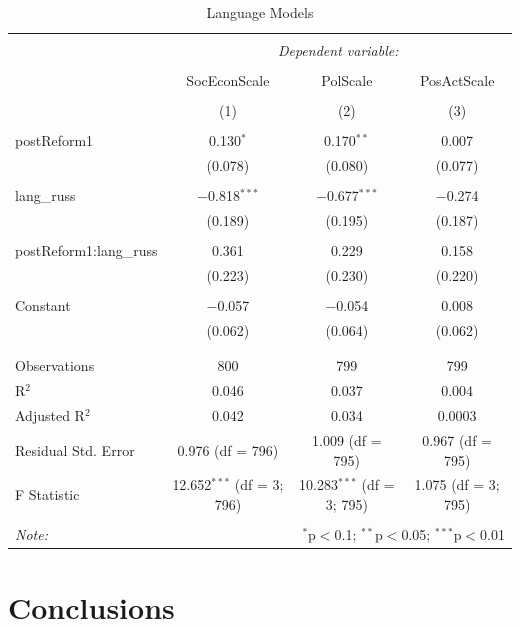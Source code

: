 \documentclass[12pt,letterpaper]{article}
\begin{document}
\begin{enumerate}
	\begin{table}[H] \centering   \caption{Language Models}   \label{} \begin{tabular}{@{\extracolsep{5pt}}p{3cm}ccc} \\[-1.8ex]\hline \hline \\[-1.8ex]  & \multicolumn{3}{c}{\textit{Dependent variable:}} \\ \cline{2-4} \\[-1.8ex] & SocEconScale & PolScale & PosActScale \\ \\[-1.8ex] & (1) & (2) & (3)\\ \hline \\[-1.8ex]  postReform1 & 0.130$^{*}$ & 0.170$^{**}$ & 0.007 \\   & (0.078) & (0.080) & (0.077) \\   & & & \\  lang\_russ & $-$0.818$^{***}$ & $-$0.677$^{***}$ & $-$0.274 \\   & (0.189) & (0.195) & (0.187) \\   & & & \\  postReform1:lang\_russ & 0.361 & 0.229 & 0.158 \\   & (0.223) & (0.230) & (0.220) \\   & & & \\  Constant & $-$0.057 & $-$0.054 & 0.008 \\   & (0.062) & (0.064) & (0.062) \\   & & & \\ \hline \\[-1.8ex] Observations & 800 & 799 & 799 \\ R$^{2}$ & 0.046 & 0.037 & 0.004 \\ Adjusted R$^{2}$ & 0.042 & 0.034 & 0.0003 \\ Residual Std. Error & 0.976 (df = 796) & 1.009 (df = 795) & 0.967 (df = 795) \\ F Statistic & 12.652$^{***}$ (df = 3; 796) & 10.283$^{***}$ (df = 3; 795) & 1.075 (df = 3; 795) \\ \hline \hline \\[-1.8ex] \textit{Note:}  & \multicolumn{3}{r}{$^{*}$p$<$0.1; $^{**}$p$<$0.05; $^{***}$p$<$0.01} \\ \end{tabular} \end{table} 
	
\end{enumerate}
\newpage
\section*{Conclusions}
\end{document}
